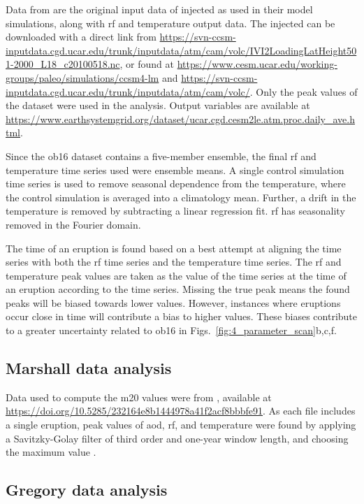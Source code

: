 \documentclass{ametsocV6.1}
\newcommand{\iso}[1][i]{{#1}njected \ce{SO2}}
\begin{document}
Data from \citet{ottobliesner2016} are the original input data of \iso{} as used in
their model simulations, along with \gls{rf} and temperature output data. The \iso{} can
be downloaded with a direct link from
\url{https://svn-ccsm-inputdata.cgd.ucar.edu/trunk/inputdata/atm/cam/volc/IVI2LoadingLatHeight501-2000_L18_c20100518.nc},
or found at \url{https://www.cesm.ucar.edu/working-groups/paleo/simulations/ccsm4-lm}
and \url{https://svn-ccsm-inputdata.cgd.ucar.edu/trunk/inputdata/atm/cam/volc/}. Only
the peak values of the  dataset were used in the analysis. Output variables are
available at
\url{https://www.earthsystemgrid.org/dataset/ucar.cgd.cesm2le.atm.proc.daily_ave.html}.

Since the \gls{ob16} dataset contains a five-member ensemble, the final \gls{rf} and
temperature time series used were ensemble means. A single control simulation time
series is used to remove seasonal dependence from the temperature, where the control
simulation is averaged into a climatology mean. Further, a drift in the temperature is
removed by subtracting a linear regression fit. \gls{rf} has seasonality removed in the
Fourier domain.

The time of an eruption is found based on a best attempt at aligning the  time
series with both the \gls{rf} time series and the temperature time series. The \gls{rf}
and temperature peak values are taken as the value of the time series at the time of an
eruption according to the  time series. Missing the true peak means the found
peaks will be biased towards lower values. However, instances where eruptions occur
close in time will contribute a bias to higher values. These biases contribute to a
greater uncertainty related to \gls{ob16} in Figs.~\ref{fig:4_parameter_scan}b,c,f.

\subsection{Marshall data analysis}\label{ap:m20}

Data used to compute the \gls{m20} values were from \citet{marshall2020dataset},
available at \url{https://doi.org/10.5285/232164e8b1444978a41f2acf8bbbfe91}. As each
file includes a single eruption, peak values of \gls{aod}, \gls{rf}, and temperature
were found by applying a Savitzky-Golay filter of third order and one-year window
length, and choosing the maximum value \citep{savitzky1964}.

\subsection{Gregory data analysis}\label{ap:g16}
\end{document}
